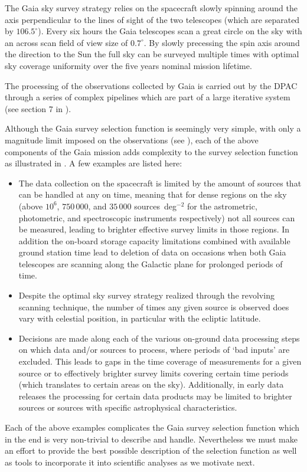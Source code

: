 The Gaia sky survey strategy relies on the spacecraft slowly spinning around the axis perpendicular to the lines of sight of the two telescopes (which are separated by $106.5^\circ$). Every six hours the Gaia telescopes scan a great circle on the sky with an across scan field of view size of $0.7^\circ$. By slowly precessing the spin axis around the direction to the Sun the full sky can be surveyed multiple times with optimal sky coverage uniformity over the five years nominal mission lifetime. 

The processing of the observations collected by Gaia is carried out by the DPAC through a series of complex pipelines which are part of a large iterative system (see section 7 in \cite{2016A&A...595A...1G}).

Although the Gaia survey selection function is seemingly very simple, with only a magnitude limit imposed on the observations (see ), each of the above components of the Gaia mission adds complexity to the survey selection function as illustrated in . A few examples are listed here:
\begin{itemize}
    \item The data collection on the spacecraft is limited by the amount of sources that can be handled at any on time, meaning that for dense regions on the sky (above $10^6$, $750\,000$, and $35\,000$ sources~deg$^{-2}$ for the astrometric, photometric, and spectroscopic instruments respectively) not all sources can be measured, leading to brighter effective survey limits in those regions. In addition the on-board storage capacity limitations combined with available ground station time lead to deletion of data on occasions when both Gaia telescopes are scanning along the Galactic plane for prolonged periods of time.
    \item Despite the optimal sky survey strategy realized through the revolving scanning technique, the number of times any given source is observed does vary with celestial position, in particular with the ecliptic latitude.
    \item Decisions are made along each of the various on-ground data processing steps on which data and/or sources to process, where periods of `bad inputs' are excluded. This leads to gaps in the time coverage of measurements for a given source or to effectively brighter survey limits covering certain time periods (which translates to certain areas on the sky). Additionally, in early data releases the processing for certain data products may be limited to brighter sources or sources with specific astrophysical characteristics.
\end{itemize}
Each of the above examples complicates the Gaia survey selection function which in the end is very non-trivial to describe and handle. Nevertheless we must make an effort to provide the best possible description of the selection function as well as tools to incorporate it into scientific analyses as we motivate next.

